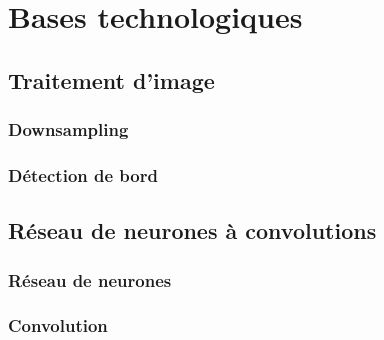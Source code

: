 \chapter{Bases technologiques}

\section{Traitement d'image}

\subsection{Downsampling}
\subsection{Détection de bord}

\section{Réseau de neurones à convolutions}
\subsection{Réseau de neurones}
\subsection{Convolution}
